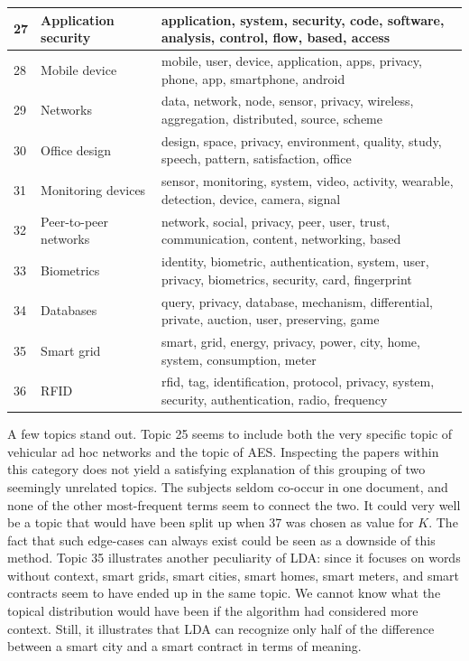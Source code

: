 \documentclass[runningheads]{llncs}
\begin{document}
\begin{longtable}{|p{0.03\linewidth}|p{0.27\linewidth}|p{0.7\linewidth}|}
27 & Application security                & application, system, security, code, software, analysis, control, flow, based, access                  \\ \hline
28 & Mobile device                       & mobile, user, device, application, apps, privacy, phone, app, smartphone, android                      \\ \hline
29 & Networks                            & data, network, node, sensor, privacy, wireless, aggregation, distributed, source, scheme               \\ \hline
30 & Office design                       & design, space, privacy, environment, quality, study, speech, pattern, satisfaction, office             \\ \hline
31 & Monitoring devices                  & sensor, monitoring, system, video, activity, wearable, detection, device, camera, signal               \\ \hline
32 & Peer-to-peer networks               & network, social, privacy, peer, user, trust, communication, content, networking, based                 \\ \hline
33 & Biometrics                          & identity, biometric, authentication, system, user, privacy, biometrics, security, card, fingerprint    \\ \hline
34 & Databases                           & query, privacy, database, mechanism, differential, private, auction, user, preserving, game            \\ \hline
35 & Smart grid                          & smart, grid, energy, privacy, power, city, home, system, consumption, meter                            \\ \hline
36 & RFID                                & rfid, tag, identification, protocol, privacy, system, security, authentication, radio, frequency       \\ \hline
\end{longtable}

A few topics stand out. Topic 25 seems to include both the very specific topic of vehicular ad hoc networks and the topic of AES. Inspecting the papers within this category does not yield a satisfying explanation of this grouping of two seemingly unrelated topics. The subjects seldom co-occur in one document, and none of the other most-frequent terms seem to connect the two. It could very well be a topic that would have been split up when 37 was chosen as value for $K$. The fact that such edge-cases can always exist could be seen as a downside of this method. Topic 35 illustrates another peculiarity of LDA: since it focuses on words without context, smart grids, smart cities, smart homes, smart meters, and smart contracts seem to have ended up in the same topic. We cannot know what the topical distribution would have been if the algorithm had considered more context. Still, it illustrates that LDA can recognize only half of the difference between a smart city and a smart contract in terms of meaning. 
\end{document}
